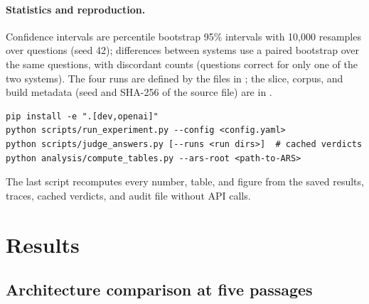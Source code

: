 \documentclass[11pt,a4paper]{article}
\begin{document}
\paragraph{Statistics and reproduction.}
Confidence intervals are percentile bootstrap 95\% intervals
\citep{efron1993bootstrap} with 10{,}000 resamples over questions (seed 42);
differences between systems use a paired bootstrap over the same questions,
with discordant counts (questions correct for only one of the two systems).
The four runs are defined by the  files in
; the slice, corpus, and build metadata (seed and
SHA-256 of the source file) are in .
\begin{verbatim}
pip install -e ".[dev,openai]"
python scripts/run_experiment.py --config <config.yaml>
python scripts/judge_answers.py [--runs <run dirs>]  # cached verdicts
python analysis/compute_tables.py --ars-root <path-to-ARS>
\end{verbatim}
The last script recomputes every number, table, and figure from the saved
results, traces, cached verdicts, and audit file without API calls.

\section{Results}
\label{sec:results}

\subsection{Architecture comparison at five passages}
\end{document}
